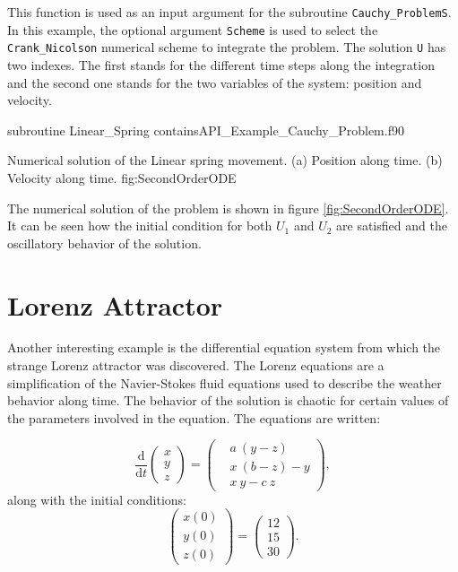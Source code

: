 This function is used as an input argument for the subroutine \verb|Cauchy_ProblemS|. In this example, the optional argument \verb|Scheme| is used to select the \verb|Crank_Nicolson| numerical scheme to integrate the problem. The solution \verb|U| has two indexes. The first stands for the different time steps along the integration and the second one stands for the two variables of the system: position and velocity. 


  \vspace{0.5cm} 
 {subroutine Linear_Spring}
 {contains}{API_Example_Cauchy_Problem.f90}

  { Numerical solution of the Linear spring movement. (a) Position along time. (b) Velocity along time. }{fig:SecondOrderODE}
  
 
  The numerical solution of the problem is shown in figure \ref{fig:SecondOrderODE}. It can be seen how the initial condition for both $U_1$ and $U_2$ are satisfied and the oscillatory behavior of the solution.
  
 
  
  
  \FloatBarrier
  \section{Lorenz Attractor}
   Another interesting example is the differential equation system from which the strange Lorenz attractor was discovered. The Lorenz equations are a simplification of the Navier-Stokes fluid equations used to describe the weather behavior along time. The behavior of the solution is chaotic for certain values of the parameters involved in the equation. The equations are written:
  
  \begin{equation*}
  \frac{\text{d}}{\text{d}t}\begin{pmatrix}
  x\\
  y \\
  z
  \end{pmatrix}
  =
  \begin{pmatrix}
   & a \ (y-z)\\
   & x \ (b - z)- y \\
   & x \ y-c \ z
  \end{pmatrix},
  \end{equation*}
  along with the initial conditions:
 \begin{equation*}
  \begin{pmatrix}
  x(0) \\
  y(0) \\
  z(0)
  \end{pmatrix}
  =
  \begin{pmatrix}
  12\\
  15\\
  30
  \end{pmatrix}.
 \end{equation*}

